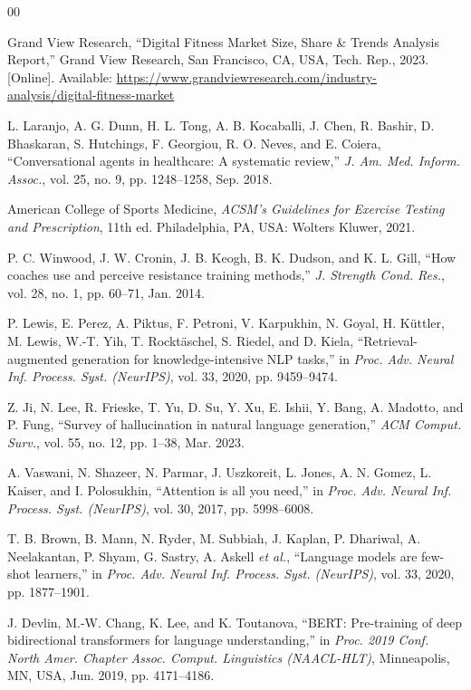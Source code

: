 \documentclass[conference]{IEEEtran}
\begin{document}
\begin{thebibliography}{00}

Grand View Research, ``Digital Fitness Market Size, Share \& Trends Analysis Report,'' Grand View Research, San Francisco, CA, USA, Tech. Rep., 2023. [Online]. Available: \url{https://www.grandviewresearch.com/industry-analysis/digital-fitness-market}

L. Laranjo, A. G. Dunn, H. L. Tong, A. B. Kocaballi, J. Chen, R. Bashir, D. Bhaskaran, S. Hutchings, F. Georgiou, R. O. Neves, and E. Coiera, ``Conversational agents in healthcare: A systematic review,'' \textit{J. Am. Med. Inform. Assoc.}, vol. 25, no. 9, pp. 1248--1258, Sep. 2018.

American College of Sports Medicine, \textit{ACSM's Guidelines for Exercise Testing and Prescription}, 11th ed. Philadelphia, PA, USA: Wolters Kluwer, 2021.

P. C. Winwood, J. W. Cronin, J. B. Keogh, B. K. Dudson, and K. L. Gill, ``How coaches use and perceive resistance training methods,'' \textit{J. Strength Cond. Res.}, vol. 28, no. 1, pp. 60--71, Jan. 2014.

P. Lewis, E. Perez, A. Piktus, F. Petroni, V. Karpukhin, N. Goyal, H. K\"{u}ttler, M. Lewis, W.-T. Yih, T. Rockt\"{a}schel, S. Riedel, and D. Kiela, ``Retrieval-augmented generation for knowledge-intensive NLP tasks,'' in \textit{Proc. Adv. Neural Inf. Process. Syst. (NeurIPS)}, vol. 33, 2020, pp. 9459--9474.

Z. Ji, N. Lee, R. Frieske, T. Yu, D. Su, Y. Xu, E. Ishii, Y. Bang, A. Madotto, and P. Fung, ``Survey of hallucination in natural language generation,'' \textit{ACM Comput. Surv.}, vol. 55, no. 12, pp. 1--38, Mar. 2023.

A. Vaswani, N. Shazeer, N. Parmar, J. Uszkoreit, L. Jones, A. N. Gomez, L. Kaiser, and I. Polosukhin, ``Attention is all you need,'' in \textit{Proc. Adv. Neural Inf. Process. Syst. (NeurIPS)}, vol. 30, 2017, pp. 5998--6008.

T. B. Brown, B. Mann, N. Ryder, M. Subbiah, J. Kaplan, P. Dhariwal, A. Neelakantan, P. Shyam, G. Sastry, A. Askell \textit{et al.}, ``Language models are few-shot learners,'' in \textit{Proc. Adv. Neural Inf. Process. Syst. (NeurIPS)}, vol. 33, 2020, pp. 1877--1901.

J. Devlin, M.-W. Chang, K. Lee, and K. Toutanova, ``BERT: Pre-training of deep bidirectional transformers for language understanding,'' in \textit{Proc. 2019 Conf. North Amer. Chapter Assoc. Comput. Linguistics (NAACL-HLT)}, Minneapolis, MN, USA, Jun. 2019, pp. 4171--4186.


\end{thebibliography}
\end{document}
